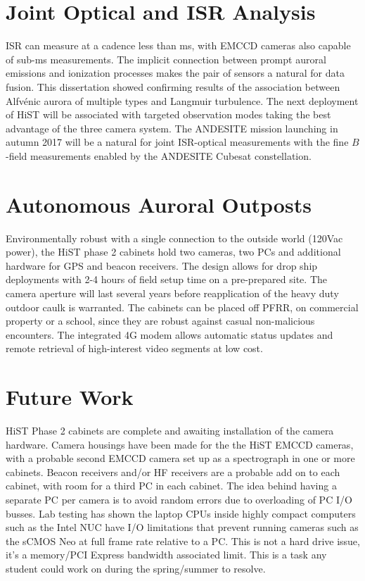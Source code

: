 \section{Joint Optical and ISR Analysis}
ISR can measure at a cadence less than \unit[20]{ms}, with EMCCD cameras also capable of sub-\unit[20]{ms} measurements.
The implicit connection between prompt auroral emissions and ionization processes makes the pair of sensors a natural for data fusion.
This dissertation showed confirming results of the association between Alfvénic aurora of multiple types and Langmuir turbulence.
The next deployment of HiST will be associated with targeted observation modes taking the best advantage of the three camera system.
The ANDESITE mission launching in autumn 2017 will be a natural for joint ISR-optical measurements with the fine $B$-field measurements enabled by the ANDESITE Cubesat constellation.

\section{Autonomous Auroral Outposts}
Environmentally robust with a single connection to the outside world (120Vac power), the HiST phase 2 cabinets hold two cameras, two PCs and additional hardware for GPS and beacon receivers.
The design allows for drop ship deployments with 2-4 hours of field setup time on a pre-prepared site.
The camera aperture will last several years before reapplication of the heavy duty outdoor caulk is warranted. 
The cabinets can be placed off PFRR, on commercial property or a school, since they are robust against casual non-malicious encounters.
The integrated 4G modem allows automatic status updates and remote retrieval of high-interest video segments at low cost.

\section{Future Work}
HiST Phase 2 cabinets are complete and awaiting installation of the camera hardware.
Camera housings have been made for the the HiST EMCCD cameras, with a probable second EMCCD camera set up as a spectrograph in one or more cabinets.
Beacon receivers and/or HF receivers are a probable add on to each cabinet, with room for a third PC in each cabinet.
The idea behind having a separate PC per camera is to avoid random errors due to overloading of PC I/O busses.
Lab testing has shown the laptop CPUs inside highly compact computers such as the Intel NUC have I/O limitations that prevent running cameras such as the sCMOS Neo at full frame rate relative to a PC.
This is not a hard drive issue, it's a memory/PCI Express bandwidth associated limit.
This is a task any student could work on during the spring/summer to resolve.

